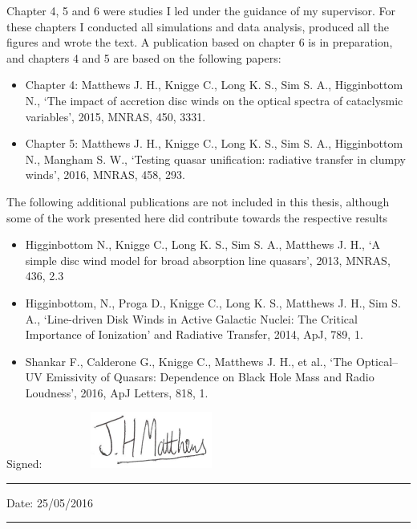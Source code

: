 \documentclass[a4paper, 11pt, twoside]{Thesis}  %
\begin{document}
{Chapter 4, 5 and 6 were studies I led under the guidance of my supervisor. For these
chapters I conducted all simulations and data analysis, produced all the figures and 
wrote the text. A publication based on chapter 6 is in preparation, and
chapters 4 and 5 are based on the following papers:
\begin{itemize}
	\item Chapter 4: Matthews J. H., Knigge C., Long K. S., Sim S. A., Higginbottom N., 
`The impact of accretion disc winds on the optical spectra of 
cataclysmic variables',
2015, MNRAS, 450, 3331.
	\item Chapter 5: Matthews J. H., Knigge C., Long K. S., Sim S. A., Higginbottom N., Mangham S. W., 
`Testing quasar unification: radiative transfer in clumpy winds',
2016, MNRAS, 458, 293.
\end{itemize}
The following additional publications are not included in this thesis, although some of the work 
presented here did contribute towards the respective results
\begin{itemize}
	\item Higginbottom N., Knigge C., Long K. S., Sim S. A., Matthews J. H., 
`A simple disc wind model for broad absorption line quasars', 2013,  
MNRAS, 436, 2.3
	\item Higginbottom, N., Proga D., Knigge C., Long K. S., Matthews J. H., Sim S. A.,
	`Line-driven Disk Winds in Active Galactic Nuclei: The Critical Importance of Ionization' 
	and Radiative Transfer, 2014, ApJ, 789, 1.
	\item Shankar F., Calderone G., Knigge C., Matthews J. H., et al., `The Optical--UV Emissivity of Quasars: Dependence on Black Hole Mass and Radio Loudness', 2016, ApJ Letters, 818, 1.
\end{itemize} 

\bigskip
\bigskip
\bigskip

Signed:~~~~~~~~
\includegraphics[width=0.3\textwidth]{figures/signature.png}\\
\rule[1em]{25em}{0.5pt}  %

\bigskip

Date: 25/05/2016\\
\rule[1em]{25em}{0.5pt}  %
}
\clearpage  %
\end{document}
